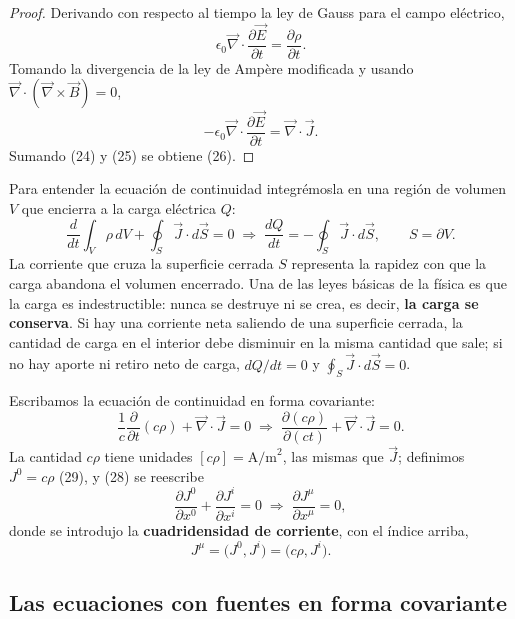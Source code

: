 \begin{proof}
Derivando con respecto al tiempo la ley de Gauss para el campo
eléctrico,
\[
\epsilon_0\vec\nabla\cdot\frac{\partial\vec E}{\partial t} = \frac{
\partial\rho}{\partial t}. \tag{24}
\]
Tomando la divergencia de la ley de Ampère modificada y usando
$\vec\nabla\cdot(\vec\nabla\times\vec B)=0$,
\[
-\epsilon_0\vec\nabla\cdot\frac{\partial\vec E}{\partial t} =
\vec\nabla\cdot\vec J . \tag{25}
\]
Sumando (24) y (25) se obtiene (26). \qedhere
\end{proof}

Para entender la ecuación de continuidad integrémosla en una región de
volumen $V$ que encierra a la carga eléctrica $Q$:
\[
\frac{d}{dt}\int_V\rho\,dV+\oint_S\vec J\cdot d\vec S=0
\;\Longrightarrow\; \frac{dQ}{dt} = -\oint_S\vec J\cdot d\vec S, \qquad
S=\partial V. \tag{27}
\]
La corriente que cruza la superficie cerrada $S$ representa la rapidez
con que la carga abandona el volumen encerrado. Una de las leyes básicas
de la física es que la carga es indestructible: nunca se destruye ni se
crea, es decir, \textbf{la carga se conserva}. Si hay una corriente neta
saliendo de una superficie cerrada, la cantidad de carga en el interior
debe disminuir en la misma cantidad que sale; si no hay aporte ni retiro
neto de carga, $dQ/dt=0$ y $\oint_S\vec J\cdot d\vec S=0$.

Escribamos la ecuación de continuidad en forma covariante:
\[
\frac1c\frac{\partial}{\partial t}(c\rho)+\vec\nabla\cdot\vec J=0
\;\Longrightarrow\; \frac{\partial(c\rho)}{\partial(ct)}+\vec\nabla\cdot
\vec J=0. \tag{28}
\]
La cantidad $c\rho$ tiene unidades $[c\rho]=\text{A/m}^2$, las mismas que
$\vec J$; definimos $J^0=c\rho$ (29), y (28) se reescribe
\[
\frac{\partial J^0}{\partial x^0}+\frac{\partial J^i}{\partial x^i}=0
\;\Longrightarrow\; \frac{\partial J^\mu}{\partial x^\mu}=0, \tag{30}
\]
donde se introdujo la \textbf{cuadridensidad de corriente}, con el índice
arriba,
\[
J^\mu = \big(J^0,J^i\big) = \big(c\rho,J^i\big). \tag{31}
\]

\subsection{Las ecuaciones con fuentes en forma covariante}

